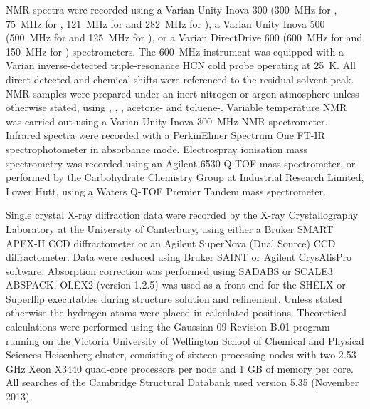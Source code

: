 NMR spectra were recorded using a Varian Unity Inova 300 (300~MHz for \proton, 75~MHz for \carbon, 121~MHz for \phosphorus{} and 282~MHz for \fluorine), a Varian Unity Inova 500 (500~MHz for \proton{} and 125~MHz for \carbon), or a Varian DirectDrive 600 (600~MHz for \proton and 150~MHz for \carbon{}) spectrometers.   The 600~MHz instrument was equipped with a Varian inverse-detected triple-resonance HCN cold probe operating at 25~K.  All direct-detected \proton{} and \carbon{} chemical shifts were referenced to the residual solvent peak.\cite{Fulmer2010}  NMR samples were prepared under an inert nitrogen or argon atmosphere unless otherwise stated, using , , , acetone- and toluene-.  Variable temperature NMR was carried out using a Varian Unity Inova 300~MHz NMR spectrometer.  Infrared spectra were recorded with a PerkinElmer Spectrum One FT-IR spectrophotometer in absorbance mode.  Electrospray ionisation mass spectrometry was recorded using an Agilent 6530 Q-TOF mass spectrometer, or performed by the Carbohydrate Chemistry Group at Industrial Research Limited, Lower Hutt, using a Waters Q-TOF Premier Tandem mass spectrometer.

Single crystal X-ray diffraction data were recorded by the X-ray Crystallography Laboratory at the University of Canterbury, using either a Bruker SMART APEX-II CCD diffractometer or an Agilent SuperNova (Dual Source) CCD diffractometer.  Data were reduced using Bruker SAINT or Agilent CrysAlisPro software.  Absorption correction was performed using SADABS or SCALE3 ABSPACK.  OLEX2 (version 1.2.5)\cite{Olex2} was used as a front-end for the SHELX\cite{Shelx} or Superflip\cite{Superflip} executables during structure solution and refinement.  Unless stated otherwise the hydrogen atoms were placed in calculated positions.  Theoretical calculations were performed using the Gaussian 09 Revision B.01 program\cite{Gaussian09, Gaussian09b} running on the Victoria University of Wellington School of Chemical and Physical Sciences Heisenberg cluster, consisting of sixteen processing nodes with two 2.53 GHz Xeon X3440 quad-core processors per node and 1 GB of memory per core.  All searches of the Cambridge Structural Databank used version 5.35 (November 2013).\cite{Allen2002}




